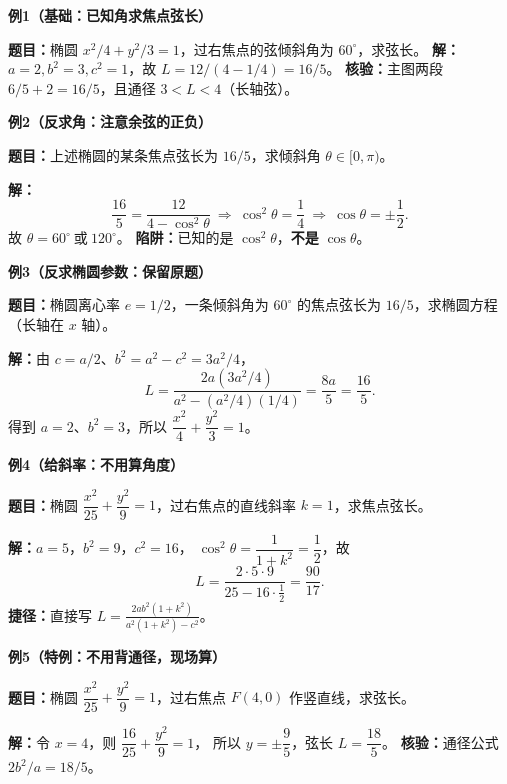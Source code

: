 \clearpage
\begin{examplebox}

\textbf{\textcolor{CExample}{例1（基础：已知角求焦点弦长）}}


\textbf{题目：}椭圆 $x^2/4+y^2/3=1$，过右焦点的弦倾斜角为 $60^\circ$，求弦长。
\textbf{解：}$a=2,b^2=3,c^2=1$，故
$L=12/(4-1/4)=\boxed{16/5}$。
\textbf{核验：}主图两段 $6/5+2=16/5$，且通径 $3<L<4$（长轴弦）。
\par\medskip
\textbf{\textcolor{CExample}{例2（反求角：注意余弦的正负）}}

\textbf{题目：}上述椭圆的某条焦点弦长为 $16/5$，求倾斜角 $\theta\in[0,\pi)$。

\begin{center}\end{center}
\textbf{解：}
\[
 \frac{16}{5}=\frac{12}{4-\cos^2\theta}
 \ \Longrightarrow\ \cos^2\theta=\frac14
 \ \Longrightarrow\ \cos\theta=\pm\frac12.
\]
故 $\boxed{\theta=60^\circ\ \text{或}\ 120^\circ}$。
\textbf{陷阱：}已知的是 $\cos^2\theta$，\textbf{不是} $\cos\theta$。

\medskip
\end{examplebox}
\clearpage
\begin{examplebox}
\textbf{\textcolor{CExample}{例3（反求椭圆参数：保留原题）}}

\textbf{题目：}椭圆离心率 $e=1/2$，一条倾斜角为 $60^\circ$ 的焦点弦长为 $16/5$，求椭圆方程（长轴在 $x$ 轴）。

\textbf{解：}由 $c=a/2$、$b^2=a^2-c^2=3a^2/4$，
\[
 L=\frac{2a(3a^2/4)}{a^2-(a^2/4)(1/4)}
 =\frac{8a}{5}=\frac{16}{5}.
\]
得到 $a=2$、$b^2=3$，所以
$\boxed{\dfrac{x^2}{4}+\dfrac{y^2}{3}=1}$。

\medskip
\textbf{\textcolor{CExample}{例4（给斜率：不用算角度）}}

\textbf{题目：}椭圆 $\dfrac{x^2}{25}+\dfrac{y^2}{9}=1$，过右焦点的直线斜率 $k=1$，求焦点弦长。

\textbf{解：}$a=5$，$b^2=9$，$c^2=16$，
$\cos^2\theta=\dfrac1{1+k^2}=\dfrac12$，故
\[
 L=\frac{2\cdot5\cdot9}{25-16\cdot\frac12}
 =\boxed{\frac{90}{17}}.
\]
\textbf{捷径：}直接写 $\displaystyle L=\frac{2ab^2(1+k^2)}{a^2(1+k^2)-c^2}$。

\medskip
\textbf{\textcolor{CExample}{例5（特例：不用背通径，现场算）}}

\textbf{题目：}椭圆 $\dfrac{x^2}{25}+\dfrac{y^2}{9}=1$，过右焦点 $F(4,0)$ 作竖直线，求弦长。

\textbf{解：}令 $x=4$，则 $\dfrac{16}{25}+\dfrac{y^2}{9}=1$，
所以 $y=\pm\dfrac95$，弦长
$\boxed{L=\dfrac{18}{5}}$。
\textbf{核验：}通径公式 $2b^2/a=18/5$。

\medskip
\end{examplebox}

